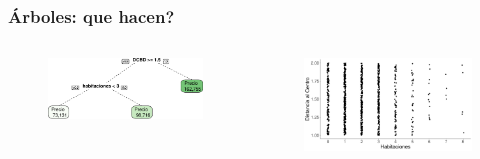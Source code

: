\documentclass[
  shownotes,
  xcolor={svgnames},
  hyperref={colorlinks,citecolor=DarkBlue,linkcolor=andesred,urlcolor=DarkBlue}
  , aspectratio=169]{beamer}
\begin{document}
\begin{frame}[fragile]
\frametitle{Árboles: que hacen?}




  
\begin{columns}[T] %
\begin{column}{.42\textwidth}
  
\begin{figure}[H] \centering
            \captionsetup{justification=centering}
              \includegraphics[scale=0.4]{figures/trees.pdf}                           
 \end{figure}

\end{column}  
\hfill
\begin{column}{.48\textwidth}

 \begin{figure}[H] \centering
            \captionsetup{justification=centering}
              \includegraphics[scale=0.25]{figures/dcbd_hab.pdf}                           
 \end{figure}

\end{column}
\end{columns}

\end{frame}
\end{document}

